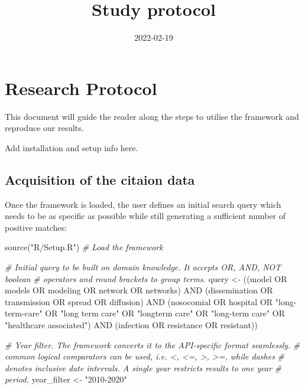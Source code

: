 \documentclass[
]{article}
\title{Study protocol}
\author{}
\date{\vspace{-2.5em}2022-02-19}
\newenvironment{Shaded}{\begin{snugshade}}{\end{snugshade}}
\newcommand{\CommentTok}[1]{\textcolor[rgb]{0.56,0.35,0.01}{\textit{#1}}}
\newcommand{\FunctionTok}[1]{\textcolor[rgb]{0.00,0.00,0.00}{#1}}
\newcommand{\NormalTok}[1]{#1}
\newcommand{\OtherTok}[1]{\textcolor[rgb]{0.56,0.35,0.01}{#1}}
\newcommand{\StringTok}[1]{\textcolor[rgb]{0.31,0.60,0.02}{#1}}
\begin{document}
\maketitle

{
\setcounter{tocdepth}{2}
\tableofcontents
}
\newpage

\hypertarget{research-protocol}{%
\section{Research Protocol}\label{research-protocol}}

This document will guide the reader along the steps to utilise the
framework and reproduce our results.

Add installation and setup info here.

\hypertarget{acquisition-of-the-citaion-data}{%
\subsection{Acquisition of the citaion
data}\label{acquisition-of-the-citaion-data}}

Once the framework is loaded, the user defines an initial search query
which needs to be as specific as possible while still generating a
sufficient number of positive matches:

\begin{Shaded}
\begin{Highlighting}[]
\FunctionTok{source}\NormalTok{(}\StringTok{"R/Setup.R"}\NormalTok{) }\CommentTok{\# Load the framework}

\CommentTok{\# Initial query to be built on domain knowledge. It accepts OR, AND, NOT boolean}
\CommentTok{\# operators and round brackets to group terms.}
\NormalTok{query }\OtherTok{\textless{}{-}} \StringTok{\textquotesingle{}((model OR models OR modeling OR network OR networks) AND}
\StringTok{(dissemination OR transmission OR spread OR diffusion) AND (nosocomial OR}
\StringTok{hospital OR "long{-}term{-}care" OR "long term care" OR "longterm care" OR}
\StringTok{"long{-}term care" OR "healthcare associated") AND (infection OR resistance OR}
\StringTok{resistant))\textquotesingle{}}

\CommentTok{\# Year filter. The framework converts it to the API{-}specific format seamlessly.}
\CommentTok{\# common logical comparators can be used, i.e. \textless{}, \textless{}=, \textgreater{}, \textgreater{}=, while dashes}
\CommentTok{\# denotes inclusive date intervals. A single year restricts results to one year}
\CommentTok{\# period.}
\NormalTok{year\_filter }\OtherTok{\textless{}{-}} \StringTok{"2010{-}2020"}
\end{Highlighting}
\end{Shaded}
\end{document}
